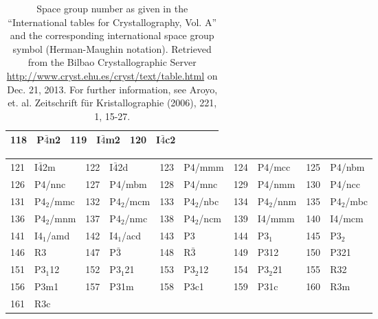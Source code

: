 \documentclass[11pt,a4paper]{report}
\begin{document}
\begin{table}[h!]
\begin{center}
\begin{tabular}{||r|l||r|l||r|l||r|l||r|l||}
118    & P$\bar{4}$n2              & 
119    & I$\bar{4}$m2              & 
120    & I$\bar{4}$c2              \\
\hline
\end{tabular}
\end{center}
\caption{\label{table:spacegroupnumber_a}Space group number as given
  in the ``International tables for Crystallography, Vol. A'' and the
  corresponding international space group symbol (Herman-Maughin
  notation). Retrieved from the Bilbao Crystallographic Server
  \url{http://www.cryst.ehu.es/cryst/text/table.html} on Dec. 21,
  2013.  For further information, see Aroyo, et. al. Zeitschrift f\"ur
  Kristallographie (2006), 221, 1, 15-27.  }
\end{table}


\begin{table}[H]
\begin{center}
\begin{tabular}{||r|l||r|l||r|l||r|l||r|l||}
\hline
121    & I$\bar{4}$2m              & 
122    & I$\bar{4}$2d              & 
123    & P4/mmm             & 
124    & P4/mcc             & 
125    & P4/nbm             \\
126    & P4/nnc             & 
127    & P4/mbm             & 
128    & P4/mnc             & 
129    & P4/nmm             & 
130    & P4/ncc             \\
131    & P4$_2$/mmc         & 
132    & P4$_2$/mcm         & 
133    & P4$_2$/nbc         & 
134    & P4$_2$/nnm         & 
135    & P4$_2$/mbc         \\
136    & P4$_2$/mnm         & 
137    & P4$_2$/nmc         & 
138    & P4$_2$/ncm         & 
139    & I4/mmm             & 
140    & I4/mcm             \\
141    & I4$_1$/amd         & 
142    & I4$_1$/acd         & 
143    & P3                 & 
144    & P3$_1$             & 
145    & P3$_2$             \\
146    & R3                 & 
147    & P$\bar{3}$         & 
148    & R$\bar{3}$         & 
149    & P312               & 
150    & P321               \\
151    & P3$_1$12           & 
152    & P3$_1$21           & 
153    & P3$_2$12           & 
154    & P3$_2$21           & 
155    & R32                \\
156    & P3m1               & 
157    & P31m               & 
158    & P3c1               & 
159    & P31c               & 
160    & R3m                \\
161    & R3c                & 

\end{tabular}
\end{center}
\end{table}
\end{document}
